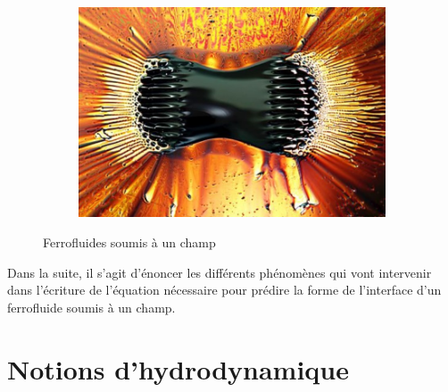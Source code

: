 \documentclass[10pt,a4paper]{article}
\begin{document}
\begin{figure}[!h]
\begin{subfigure}[b]{0.4\textwidth}
    \end{subfigure}
    \begin{subfigure}[b]{0.4\textwidth}
        \includegraphics[width=\textwidth]{images/ferro.jpg}
    \end{subfigure}
    \caption{Ferrofluides soumis à un champ \cite{site3}}
\end{figure}

Dans la suite, il s'agit d'énoncer les différents phénomènes qui vont intervenir dans l'écriture de l'équation nécessaire pour prédire la forme de l'interface d'un ferrofluide soumis à un champ.
\section{Notions d'hydrodynamique}
\end{document}

